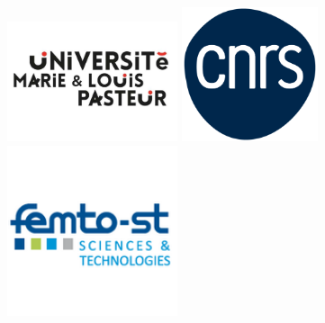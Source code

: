 \includegraphics[width=5cm]{MainLayout/Images/logo_univ.pdf}
\hspace*{1cm}
\includegraphics[width=4cm]{MainLayout/Images/LOGO_CNRS.png}
\hspace*{1cm}
\includegraphics[width=5cm]{MainLayout/Images/logo_femto.png}
\hfill

\vspace*{0mm}

